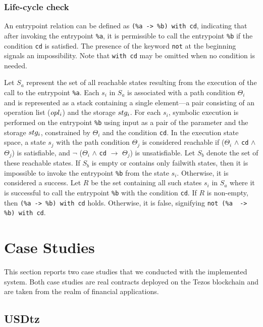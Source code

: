 \documentclass[a4paper,USenglish,cleveref, autoref,anonymous]{lipics-v2021}
\begin{document}
\subsubsection{Life-cycle check}
\label{sec:life-cycle-check}
An entrypoint relation can be defined as \lstinline/(%a -> %b) with cd/, indicating that after invoking the entrypoint \lstinline/%a/, it is permissible to call the entrypoint \lstinline/%b/ if the condition \lstinline/cd/ is satisfied. The presence of the keyword \lstinline/not/ at the beginning signals an impossibility. Note that \lstinline/with cd/ may be omitted when no condition is needed.

Let $S_a$ represent the set of all reachable states resulting from the execution of the call to the entrypoint \lstinline/%a/. Each $s_{i}$ in $S_a$ is associated with a path condition $\Theta_i$ and is represented as a stack containing a single element—a pair consisting of an operation list ($opl_i$) and the storage $stg_i$. For each $s_{i}$, symbolic execution is performed on the entrypoint \lstinline/%b/ using input as a pair of the parameter and the storage $stg_i$, constrained by $\Theta_i$ and the condition \lstinline/cd/. In the execution state space, a state $s_{j}$ with the path condition $\Theta_j$ is considered reachable if ($\Theta_i$ $\land$ \lstinline/cd/ $\land$ $\Theta_j$) is satisfiable, and $\neg$ ($\Theta_i$ $\land$ \lstinline/cd/ $\rightarrow$ $\Theta_j$) is unsatisfiable. Let $S_b$ denote the set of these reachable states. If $S_b$ is empty or contains only failwith states, then it is impossible to invoke the entrypoint \lstinline/%b/ from the state $s_{i}$. Otherwise, it is considered a success. Let $R$ be the set containing all such states $s_{i}$ in $S_a$ where it is successful to call the entrypoint \lstinline/%b/ with the condition \lstinline/cd/. If $R$ is non-empty, then \lstinline/(%a -> %b) with cd/ holds. Otherwise, it is false, signifying \lstinline/not (%a  -> %b) with cd/.

\section{Case Studies}
\label{sec:case-stud-subs}

This section reports two case studies that we conducted with the
implemented system. Both case studies are real contracts deployed on
the Tezos blockchain and are taken from the realm of financial
applications. 

\subsection{USDtz}
\label{sec:usdtz}
\end{document}
